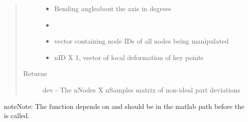 \documentclass[a4paper,10pt,english]{sphinxmanual}
\begin{document}
\begin{fulllineitems}
\begin{quote}
\begin{description}
\begin{itemize}
\item {} 
 \textendash{} Bending angleabout the axis in degrees

\item {} 
 \textendash{} 

\item {} 
 \textendash{} vector containing node IDs of all nodes being manipulated

\item {} 
 \textendash{} nID X 1, vector of local deformation of key points

\end{itemize}

\item[{Returns}] \leavevmode
dev - The nNodes X nSamples matrix of non-ideal part deviations

\end{description}\end{quote}

\begin{sphinxadmonition}{note}{Note:}
The function depends on  and should be in the matlab path before
the {\hyperref[\detokenize{index:mGRF.getMgrfDev}]{}} is called.
\end{sphinxadmonition}

\end{fulllineitems}
\end{document}
